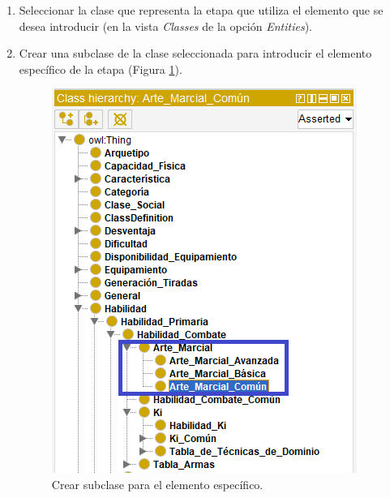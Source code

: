 \begin{enumerate}
    \item Seleccionar la clase que representa la etapa que utiliza el elemento que se desea introducir 
    (en la vista \textit{Classes} de la opción \textit{Entities}).
    \item Crear una subclase de la clase seleccionada para introducir el elemento específico de la etapa 
    (Figura \ref*{ElementoComun_1}).\newpage
    \begin{figure}[H]
        \centering
        \includegraphics[scale=0.6]{Figures/Protege/ElementoComun_1.png}
        \caption{Crear subclase para el elemento específico.}
        \label{ElementoComun_1}
    \end{figure}


\end{enumerate}
